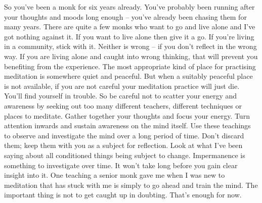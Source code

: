 So you've been a monk for six years already. You've probably been running after your thoughts and moods long enough -- you've already been chasing them for many years. There are quite a few monks who want to go and live alone and I've got nothing against it. If you want to live alone then give it a go. If you're living in a community, stick with it. Neither is wrong -- if you don't reflect in the wrong way. If you are living alone and caught into wrong thinking, that will prevent you benefiting from the experience. The most appropriate kind of place for practising meditation is somewhere quiet and peaceful. But when a suitably peaceful place is not available, if you are not careful your meditation practice will just die. You'll find yourself in trouble. So be careful not to scatter your energy and awareness by seeking out too many different teachers, different techniques or places to meditate. Gather together your thoughts and focus your energy. Turn attention inwards and sustain awareness on the mind itself. Use these teachings to observe and investigate the mind over a long period of time. Don't discard them; keep them with you as a subject for reflection. Look at what I've been saying about all conditioned things being subject to change. Impermanence is something to investigate over time. It won't take long before you gain clear insight into it. One teaching a senior monk gave me when I was new to meditation that has stuck with me is simply to go ahead and train the mind. The important thing is not to get caught up in doubting. That's enough for now.  

